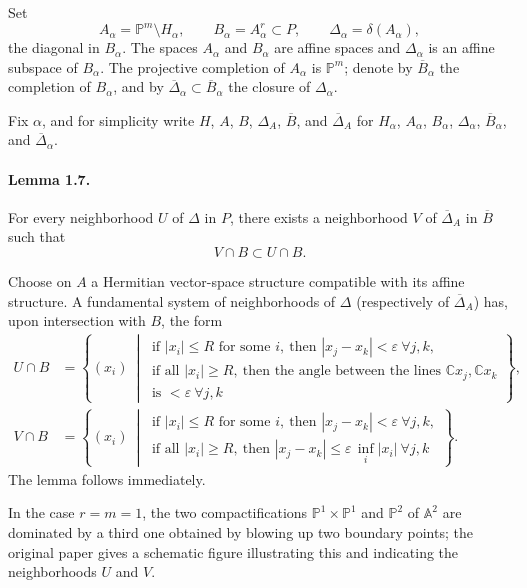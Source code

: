 \documentclass[11pt]{amsart}
\newcommand{\PP}{\mathbb{P}}
\newcommand{\CC}{\mathbb{C}}
\newcommand{\A}{\mathbb{A}}
\newcommand{\DeltaDiag}{\Delta}
\begin{document}
Set
\[
A_\alpha=\PP^m\setminus H_\alpha,\qquad B_\alpha=A_\alpha^r\subset P,\qquad \Delta_\alpha=\delta(A_\alpha),
\]
the diagonal in $B_\alpha$. The spaces $A_\alpha$ and $B_\alpha$ are affine spaces and $\Delta_\alpha$ is an affine subspace of $B_\alpha$. The projective completion of $A_\alpha$ is $\PP^m$; denote by $\overline B_\alpha$ the completion of $B_\alpha$, and by $\overline\Delta_\alpha\subset \overline B_\alpha$ the closure of $\Delta_\alpha$.

Fix $\alpha$, and for simplicity write $H$, $A$, $B$, $\Delta_A$, $\overline B$, and $\overline \Delta_A$ for $H_\alpha$, $A_\alpha$, $B_\alpha$, $\Delta_\alpha$, $\overline B_\alpha$, and $\overline\Delta_\alpha$.

\paragraph{\textbf{Lemma 1.7.}}
For every neighborhood $U$ of $\DeltaDiag$ in $P$, there exists a neighborhood $V$ of $\overline\Delta_A$ in $\overline B$ such that
\[
V\cap B \subset U\cap B.
\]

Choose on $A$ a Hermitian vector-space structure compatible with its affine structure. A fundamental system of neighborhoods of $\DeltaDiag$ (respectively of $\overline\Delta_A$) has, upon intersection with $B$, the form
\begin{align*}
U\cap B
&=
\left\{(x_i)\ \middle|\ 
\begin{array}{l}
\text{if } |x_i|\le R \text{ for some }i,\ \text{then } |x_j-x_k|<\varepsilon\ \forall j,k,\\
\text{if all }|x_i|\ge R,\ \text{then the angle between the lines } \CC x_j,\CC x_k\\
\text{is }<\varepsilon\ \forall j,k
\end{array}
\right\},\\[1ex]
V\cap B
&=
\left\{(x_i)\ \middle|\ 
\begin{array}{l}
\text{if } |x_i|\le R \text{ for some }i,\ \text{then } |x_j-x_k|<\varepsilon\ \forall j,k,\\
\text{if all }|x_i|\ge R,\ \text{then } |x_j-x_k|\le \varepsilon\, \inf_i |x_i|\ \forall j,k
\end{array}
\right\}.
\end{align*}
The lemma follows immediately.

In the case $r=m=1$, the two compactifications $\PP^1\times \PP^1$ and $\PP^2$ of $\A^2$ are dominated by a third one obtained by blowing up two boundary points; the original paper gives a schematic figure illustrating this and indicating the neighborhoods $U$ and $V$.
\end{document}
